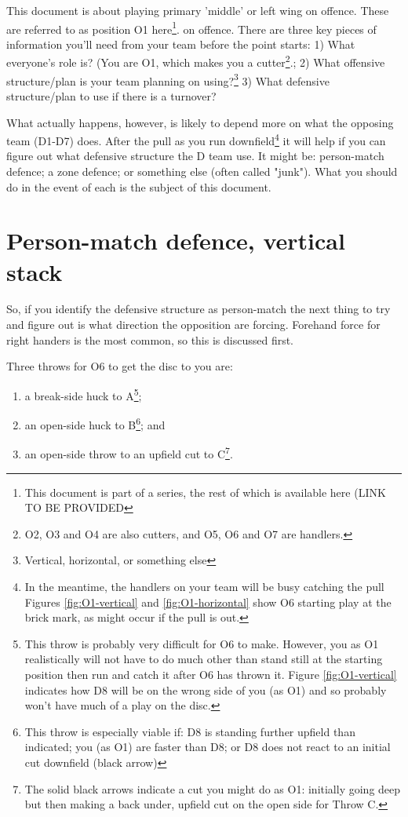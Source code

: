 \documentclass{tufte-handout}
\begin{document}
This document is about 
playing primary 'middle' 
or left wing 
on offence. 
These are
referred to as position O1 here\footnote{This document
is part of a series, 
the rest of which is available here (LINK TO BE PROVIDED}.
 on offence.
There are three key pieces of information you'll need from your team before the point starts:
1) What everyone's role is? 
(You are O1, 
which makes you a cutter\footnote{  
O2, O3 and O4 are also cutters, and
O5, O6 and O7 are handlers.}.;
2) What offensive structure/plan is your team planning on using?\footnote{
Vertical,
horizontal, 
or something else}
3) What defensive structure/plan to use if there is a turnover? 

What actually happens, 
however, 
is likely to depend more on 
what the opposing team (D1-D7) does. 
After the pull 
as you run downfield\footnote{
In the meantime, 
the handlers on your team 
will be busy 
catching the pull
Figures \ref{fig:O1-vertical} and  \ref{fig:O1-horizontal} 
show O6 starting play 
at the brick mark, 
as might occur if 
the pull is out.} it will help 
if you can figure out 
what defensive structure the D team use.
It might be:
person-match defence;
a zone defence; or
something else
(often called "junk").
What you should do 
in the event of each
is the subject of this document. 


\section{Person-match defence, vertical stack}\label{sec:vertical}
So, if you identify the defensive structure as person-match
the next thing to try and figure out
is what direction the opposition are forcing. 
Forehand force for right handers is the most common, 
so this is discussed first. 

Three throws for O6 
to get the disc 
to you are:
\begin{enumerate}
\item a break-side 
huck to A\footnote{
This throw is 
probably
very difficult for O6 to make. 
However, you as O1
realistically will not have to do much
other than stand still at the starting position
then run and catch it
after O6 has thrown it. 
Figure \ref{fig:O1-vertical} indicates how 
D8 will be on the wrong side of you (as O1)
and so probably won't have much of a play on the disc.};

\item an open-side huck to B\footnote{
This throw is especially viable if: 
D8 is standing further upfield than indicated; 
you (as O1) are faster than D8; or 
D8 does not react to an initial cut downfield (black arrow)}; and 
\item an open-side throw 
to an upfield cut to C\footnote{
The solid black arrows indicate 
a cut you might do as O1:
initially going deep
but then making a back under, 
upfield cut 
on the open side
for Throw C.}.
\end{enumerate}
\end{document}
